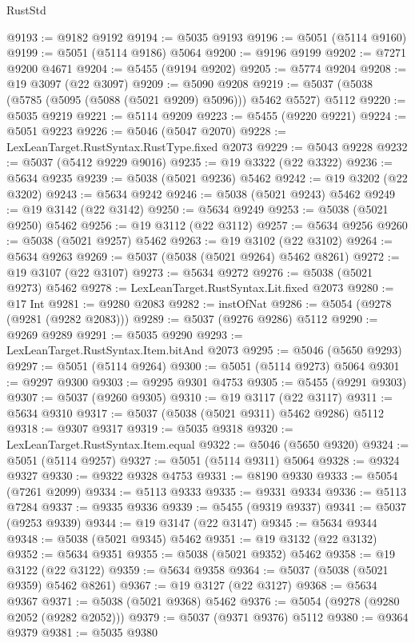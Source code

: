 \begin{lexlean}{RustStd}
\begin{coremodule}
@9193 := @9182 @9192
@9194 := @5035 @9193
@9196 := @5051 (@5114 @9160)
@9199 := @5051 (@5114 @9186) @5064
@9200 := @9196 @9199
@9202 := @7271 @9200 @4671
@9204 := @5455 (@9194 @9202)
@9205 := @5774 @9204
@9208 := @19 @3097 (@22 @3097)
@9209 := @5090 @9208
@9219 := @5037 (@5038 (@5785 (@5095 (@5088 (@5021 @9209) @5096))) @5462 @5527) @5112
@9220 := @5035 @9219
@9221 := @5114 @9209
@9223 := @5455 (@9220 @9221)
@9224 := @5051 @9223
@9226 := @5046 (@5047 @2070)
@9228 := LexLeanTarget.RustSyntax.RustType.fixed @2073
@9229 := @5043 @9228
@9232 := @5037 (@5412 @9229 @9016)
@9235 := @19 @3322 (@22 @3322)
@9236 := @5634 @9235
@9239 := @5038 (@5021 @9236) @5462
@9242 := @19 @3202 (@22 @3202)
@9243 := @5634 @9242
@9246 := @5038 (@5021 @9243) @5462
@9249 := @19 @3142 (@22 @3142)
@9250 := @5634 @9249
@9253 := @5038 (@5021 @9250) @5462
@9256 := @19 @3112 (@22 @3112)
@9257 := @5634 @9256
@9260 := @5038 (@5021 @9257) @5462
@9263 := @19 @3102 (@22 @3102)
@9264 := @5634 @9263
@9269 := @5037 (@5038 (@5021 @9264) @5462 @8261)
@9272 := @19 @3107 (@22 @3107)
@9273 := @5634 @9272
@9276 := @5038 (@5021 @9273) @5462
@9278 := LexLeanTarget.RustSyntax.Lit.fixed @2073
@9280 := @17 Int
@9281 := @9280 @2083
@9282 := instOfNat
@9286 := @5054 (@9278 (@9281 (@9282 @2083)))
@9289 := @5037 (@9276 @9286) @5112
@9290 := @9269 @9289
@9291 := @5035 @9290
@9293 := LexLeanTarget.RustSyntax.Item.bitAnd @2073
@9295 := @5046 (@5650 @9293)
@9297 := @5051 (@5114 @9264)
@9300 := @5051 (@5114 @9273) @5064
@9301 := @9297 @9300
@9303 := @9295 @9301 @4753
@9305 := @5455 (@9291 @9303)
@9307 := @5037 (@9260 @9305)
@9310 := @19 @3117 (@22 @3117)
@9311 := @5634 @9310
@9317 := @5037 (@5038 (@5021 @9311) @5462 @9286) @5112
@9318 := @9307 @9317
@9319 := @5035 @9318
@9320 := LexLeanTarget.RustSyntax.Item.equal
@9322 := @5046 (@5650 @9320)
@9324 := @5051 (@5114 @9257)
@9327 := @5051 (@5114 @9311) @5064
@9328 := @9324 @9327
@9330 := @9322 @9328 @4753
@9331 := @8190 @9330
@9333 := @5054 (@7261 @2099)
@9334 := @5113 @9333
@9335 := @9331 @9334
@9336 := @5113 @7284
@9337 := @9335 @9336
@9339 := @5455 (@9319 @9337)
@9341 := @5037 (@9253 @9339)
@9344 := @19 @3147 (@22 @3147)
@9345 := @5634 @9344
@9348 := @5038 (@5021 @9345) @5462
@9351 := @19 @3132 (@22 @3132)
@9352 := @5634 @9351
@9355 := @5038 (@5021 @9352) @5462
@9358 := @19 @3122 (@22 @3122)
@9359 := @5634 @9358
@9364 := @5037 (@5038 (@5021 @9359) @5462 @8261)
@9367 := @19 @3127 (@22 @3127)
@9368 := @5634 @9367
@9371 := @5038 (@5021 @9368) @5462
@9376 := @5054 (@9278 (@9280 @2052 (@9282 @2052)))
@9379 := @5037 (@9371 @9376) @5112
@9380 := @9364 @9379
@9381 := @5035 @9380

\end{coremodule}
\end{lexlean}
